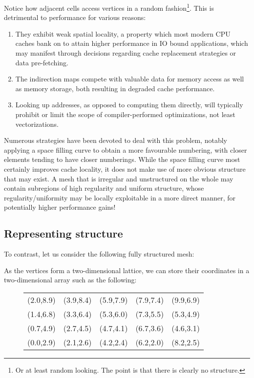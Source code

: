 Notice how adjacent cells access vertices in a random fashion\footnote{Or at least random looking. The point is that there is clearly no structure.}. This is detrimental to performance for various reasons:

\begin{enumerate}
\item They exhibit weak spatial locality, a property which most modern CPU caches bank on to attain higher performance in IO bound applications, which may manifest through decisions regarding cache replacement strategies or data pre-fetching.
\item The indirection maps compete with valuable data for memory access as well as memory storage, both resulting in degraded cache performance.
\item Looking up addresses, as opposed to computing them directly, will typically prohibit or limit the scope of compiler-performed optimizations, not least vectorizations.
\end{enumerate}

Numerous strategies have been devoted to deal with this problem, notably applying a space filling curve to obtain a more favourable numbering, with closer elements tending to have closer numberings. While the space filling curve most certainly improves cache locality, it does not make use of more obvious structure that may exist. A mesh that is irregular and unstructured on the whole may contain subregions of high regularity and uniform structure, whose regularity/uniformity may be locally exploitable in a more direct manner, for potentially higher performance gains!


\subsection{Representing structure}
To contrast, let us consider the following fully structured mesh:
\begin{figure}[H]
\centering

\end{figure}

As the vertices form a two-dimensional lattice, we can store their coordinates in a two-dimensional array such as the following:
\begin{figure}[H]
\centering
\begin{tabular}{|c|c|c|c|c|}
(2.0,8.9) & (3.9,8.4) & (5.9,7.9) & (7.9,7.4) & (9.9,6.9) \\
(1.4,6.8) & (3.3,6.4) & (5.3,6.0) & (7.3,5.5) & (5.3,4.9) \\
(0.7,4.9) & (2.7,4.5) & (4.7,4.1) & (6.7,3.6) & (4.6,3.1) \\
(0.0,2.9) & (2.1,2.6) & (4.2,2.4) & (6.2,2.0) & (8.2,2.5) \\
\end{tabular}
\end{figure}

